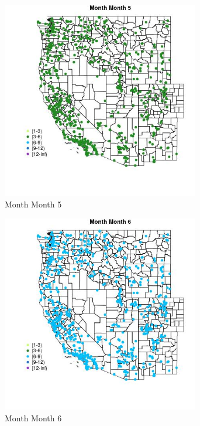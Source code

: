 \begin{figure} 
\centering  
\includegraphics[width=0.77\textwidth]{Code_Outputs/Report_ML_input_PM25_Step4_part_e_de_duplicated_aveswNAs_MapObsMo5Month.jpg} 
\caption{\label{fig:Report_ML_input_PM25_Step4_part_e_de_duplicated_aveswNAsMapObsMo5Month}Month Month 5} 
\end{figure} 
 

\begin{figure} 
\centering  
\includegraphics[width=0.77\textwidth]{Code_Outputs/Report_ML_input_PM25_Step4_part_e_de_duplicated_aveswNAs_MapObsMo6Month.jpg} 
\caption{\label{fig:Report_ML_input_PM25_Step4_part_e_de_duplicated_aveswNAsMapObsMo6Month}Month Month 6} 
\end{figure} 
 

